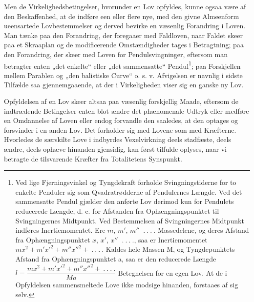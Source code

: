 \documentclass[12pt,a4paper]{book}
\begin{document}
Men de Virkelighedsbetingelser, hvorunder en Lov opfyldes,
kunne ogsaa være af den Beskaffenhed, at de indføre een eller
flere nye, med den givne Almeenform ueensartede Lovbestemmelser
og derved bevirke en væsenlig Forandring i Loven. Man tænke
paa den Forandring, der foregaaer med Faldloven, naar Faldet
skeer paa et Skraaplan og de modificerende Omstændigheder tages
i Betragtning;
paa den Forandring, der skeer med Loven for Pendulsvingninger,
eftersom man betragter enten „det enkelte“ eller „det
sammensatte“ Pendul\footnote{Ved lige Fjerningsvinkel og Tyngdekraft
forholde Svingningstiderne for to enkelte Penduler sig som
Qvadratrødderne af Pendulernes Længde. Ved det sammensatte
Pendul gjælder den anførte Lov derimod kun for Pendulets
reducerede Længde, d. e. for Afstanden fra Ophængningspunktet til
Svingningernes Midtpunkt. Ved Bestemmelsen af Svingningernes
Midtpunkt indføres Inertiemomentet. Ere $m$, $m'$, $m''$
$\ .\ .\ .\ .$ Massedelene, og deres Afstand fra
Ophængningspunktet $x$, $x'$, $x''$ $\ .\ .\ .\ .$, saa er Inertiemomentet
$mx^{2} + m'x'^{2} + m''x''^{2} + \ .\ .\ .\ .$ Kaldes hele Massen
M, og Tyngdepunktets Afstand fra Ophængningspunktet a, saa er
den reducerede Længde
$l = \dfrac{mx^{2} + m'x'^{2} + m''x''^{2} + \ .\ .\ .\ .}{Ma}$
Betegnelsen for en egen Lov. At de i Opfyldelsen sammensmeltede
Love ikke modsige hinanden, forstaaes af sig selv.}; paa
Forskjellen mellem Parablen og „den balistiske Curve“ o. s. v.
Afvigelsen er navnlig i sidste Tilfælde saa gjennemgaaende, at
der i Virkeligheden viser sig en ganske ny Lov.

Opfyldelsen af en Lov skeer altsaa paa væsenlig forskjellig
Maade, eftersom de indtrædende Betingelser enten blot ændre det
phænomenale Udtryk eller medføre en Omdannelse af Loven eller
endog forvandle den saaledes, at den optages og forsvinder i en
anden Lov. Det forholder sig med Lovene som med Kræfterne.
Hvorledes de særskilte Love i indbyrdes Vexelvirkning deels
stadfæste, deels ændre, deels ophæve hinanden gjensidig, kan først
tilfulde oplyses, naar vi betragte de tilsvarende Kræfter fra
Totalitetens Synspunkt.
\end{document}
